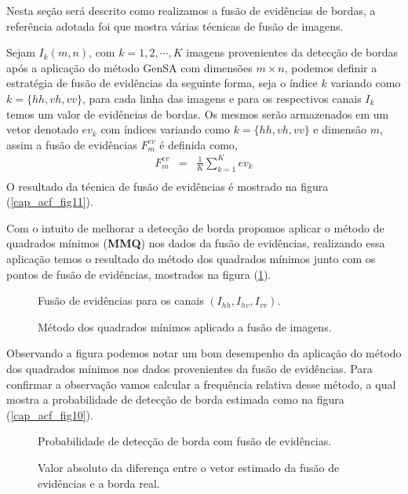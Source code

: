 	Nesta seção será descrito como realizamos a fusão de evidências de bordas, a referência adotada foi \citet{mit} que mostra várias técnicas de fusão de imagens. 

	Sejam $I_k(m,n)$, com $k=1,2,\cdots,K$ imagens provenientes da detecção de bordas após a aplicação do método GenSA com dimensões $m \times n$, podemos definir a estratégia de fusão de evidências da seguinte forma, seja o índice $k$ variando como $k=\{hh,vh,vv\}$, para cada linha das imagens e para os respectivos canais $I_k$ temos um valor de evidências de bordas.  Os mesmos serão armazenados em um vetor denotado $ev_k$ com índices variando como $k=\{hh,vh,vv\}$ e dimensão $m$, assim a fusão de evidências $F_{m}^{ev}$ é definida como,
\begin{equation}\label{cap_acf_27}
\begin{array}{lll}
	F_{m}^{ev} &=&\frac{1}{K}\sum_{k=1}^{K}ev_k  \\
\end{array}
\end{equation}
 O resultado da técnica de fusão de evidências é mostrado na figura (\ref{cap_acf_fig11}).

Com o intuito de melhorar a detecção de borda propomos aplicar o método de quadrados mínimos (\textbf{MMQ}) nos dados da fusão de evidências, realizando essa aplicação temos o resultado do método dos quadrados mínimos junto com os pontos de fusão de evidências, mostrados na figura (\ref{cap_acf_fig12}).
\begin{figure}[hbt]
	\caption{Fusão de evidências para os canais $\left(I_{hh}, I_{hv}, I_{vv}\right)$.}
\label{cap_acf_fig11}
\endminipage\hfill
{}
\caption{Método dos quadrados mínimos aplicado a fusão de imagens.}
\label{cap_acf_fig12}
\endminipage\hfill
\end{figure}
Observando a figura podemos notar um bom desempenho da aplicação do método dos quadrados mínimos nos dados provenientes da fusão de evidências. Para confirmar a observação vamos calcular a frequência relativa desse método, a qual mostra a probabilidade de detecção de borda estimada como na figura (\ref{cap_acf_fig10}).
\begin{figure}[hbt]
	\caption{Probabilidade de detecção de borda com fusão de evidências.}
\label{cap_acf_fig13}
\endminipage\hfill
{}
	\caption{Valor absoluto da diferença entre o vetor estimado da fusão de evidências e a borda real.}
\label{cap_acf_fig14}
\endminipage\hfill
\end{figure}

